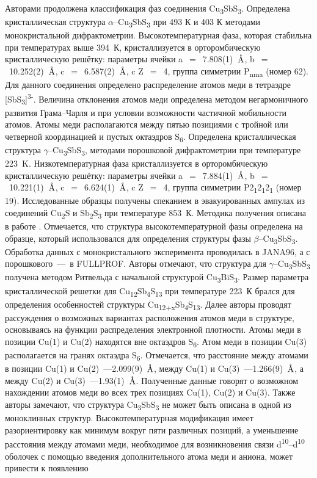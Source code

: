 Авторами \cite{Pfitzner1998a} продолжена классификация фаз соединения Cu\textsubscript{3}SbS\textsubscript{3}. Определена кристаллическая структура $\alpha$--Cu\textsubscript{3}SbS\textsubscript{3} при 493 К и 403 К методами монокристальной дифрактометрии. Высокотемпературная фаза, которая стабильна при температурах выше 394~К, кристаллизуется в орторомбическую кристаллическую решётку: параметры ячейки a~$=$~7.808(1)~$\mbox{\normalfont\AA}$, b~$=$~10.252(2)~$\mbox{\normalfont\AA}$, c~$=$~6.587(2)~$\mbox{\normalfont\AA}$,  c Z~$=$~4, группа симметрии P\textsubscript{nma} (номер 62). Для данного соединения определено распределение атомов меди в тетраэдре [SbS\textsubscript{3}]\textsuperscript{3-}. Величина отклонения атомов меди определена методом негармоничного развития Грама--Чарля и при условии возможности частичной мобильности атомов. Атомы меди располагаются между пятью позициями с тройной или четверной координацией и пустых октаэдров S\textsubscript{6}. Определена кристаллическая структура $\gamma$--Cu\textsubscript{3}SbS\textsubscript{3}, методами порошковой дифрактометрии при температуре 223~K. Низкотемпературная фаза кристаллизуется в орторомбическую кристаллическую решётку: параметры ячейки a~$=$~7.884(1)~$\mbox{\normalfont\AA}$, b~$=$~10.221(1)~$\mbox{\normalfont\AA}$, c~$=$~6.624(1)~$\mbox{\normalfont\AA}$,  c Z~$=$~4, группа симметрии P2\textsubscript{1}2\textsubscript{1}2\textsubscript{1} (номер 19). Исследованные образцы получены спеканием в эвакуированных ампулах из соединений Cu\textsubscript{2}S и Sb\textsubscript{2}S\textsubscript{3} при температуре 853~К. Методика получения описана в работе \cite{Pfitzner_1994}. Отмечается, что структура высокотемпературной фазы определена на образце,  который использовался для определения структуры фазы $\beta$--Cu\textsubscript{3}SbS\textsubscript{3}. Обработка данных с монокристального эксперимента проводилась в JANA96, а с порошкового~---~в FULLPROF. Авторы отмечают, что структура для $\gamma$--Cu\textsubscript{3}SbS\textsubscript{3} получена методом Ритвельда с начальной структурой Cu\textsubscript{3}BiS\textsubscript{3}. Размер параметра кристаллической решетки для Cu\textsubscript{12}Sb\textsubscript{4}S\textsubscript{13} при температуре 223~К брался для определения особенностей структуры Cu\textsubscript{12+x}Sb\textsubscript{4}S\textsubscript{13}. Далее авторы проводят рассуждения о возможных вариантах расположения атомов меди в структуре, основываясь на  функции распределения электронной плотности. Атомы меди в позиции Cu(1) и Cu(2) находятся вне октаэдров S\textsubscript{6}. Атом меди в позиции Cu(3) располагается на гранях октаэдра  S\textsubscript{6}. Отмечается, что расстояние между атомами в позиции Cu(1) и Cu(2)~---2.099(9)~$\mbox{\normalfont\AA}$, между  Cu(1) и Cu(3)~---1.266(9)~$\mbox{\normalfont\AA}$, а между Cu(2) и Cu(3)~---1.93(1)~$\mbox{\normalfont\AA}$. Полученные данные говорят о возможном нахождении атомов меди во всех трех позициях Cu(1), Cu(2) и Cu(3). Также авторы замечают, что структура Cu\textsubscript{3}SbS\textsubscript{3} не может быть описана в одной из моноклинных структур. Высокотемпературная модификация имеет разориентировку как минимум вокруг пяти различных позиций, а уменьшение расстояния между атомами меди, необходимое для возникновения связи d\textsuperscript{10}--d\textsuperscript{10} оболочек с помощью введения дополнительного атома меди и аниона, может привести к появлению 